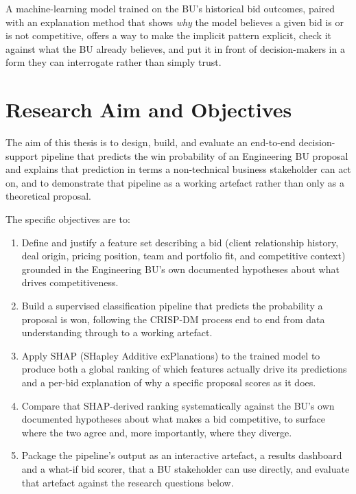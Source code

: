 \documentclass[12pt,oneside]{report}
\providecommand{\tightlist}{%
  \setlength{\itemsep}{0pt}\setlength{\parskip}{0pt}}
\begin{document}
A machine-learning model trained on the BU's historical bid outcomes,
paired with an explanation method that shows \emph{why} the model
believes a given bid is or is not competitive, offers a way to make the
implicit pattern explicit, check it against what the BU already
believes, and put it in front of decision-makers in a form they can
interrogate rather than simply trust.

\hypertarget{research-aim-and-objectives}{%
\section{Research Aim and
Objectives}\label{research-aim-and-objectives}}

The aim of this thesis is to design, build, and evaluate an end-to-end
decision-support pipeline that predicts the win probability of an
Engineering BU proposal and explains that prediction in terms a
non-technical business stakeholder can act on, and to demonstrate that
pipeline as a working artefact rather than only as a theoretical
proposal.

The specific objectives are to:

\begin{enumerate}
\def\labelenumi{\arabic{enumi}.}
\tightlist
\item
  Define and justify a feature set describing a bid (client relationship
  history, deal origin, pricing position, team and portfolio fit, and
  competitive context) grounded in the Engineering BU's own documented
  hypotheses about what drives competitiveness.
\item
  Build a supervised classification pipeline that predicts the
  probability a proposal is won, following the CRISP-DM process
  \citep{chapman2000crispdm} end to end from data understanding through
  to a working artefact.
\item
  Apply SHAP (SHapley Additive exPlanations) \citep{lundberg2017unified}
  to the trained model to produce both a global ranking of which
  features actually drive its predictions and a per-bid explanation of
  why a specific proposal scores as it does.
\item
  Compare that SHAP-derived ranking systematically against the BU's own
  documented hypotheses about what makes a bid competitive, to surface
  where the two agree and, more importantly, where they diverge.
\item
  Package the pipeline's output as an interactive artefact, a results
  dashboard and a what-if bid scorer, that a BU stakeholder can use
  directly, and evaluate that artefact against the research questions
  below.
\end{enumerate}
\end{document}
